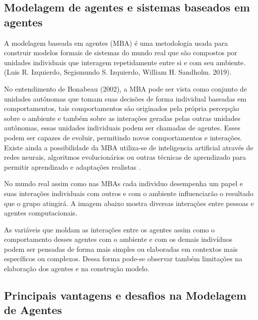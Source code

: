\subsection{Modelagem de agentes e sistemas baseados em agentes}

A modelagem baseada em agentes (MBA) é uma metodologia usada para construir modelos formais de sistemas do mundo real que são compostos por unidades individuais que interagem repetidamente entre si e com seu ambiente.(Luis R. Izquierdo, Segismundo S. Izquierdo, William H. Sandholm. 2019)\cite{izquierdo2019introduction}. 

No entendimento de Bonabeau (2002), a MBA pode ser vista como conjunto de unidades autônomas que tomam suas decisões de forma individual baseadas em comportamentos, tais comportamentos são originados pela própria percepção sobre o ambiente e também sobre as interações geradas pelas outras unidades autônomas, essas unidades individuais podem ser chamadas de agentes. Esses podem ser capazes de evoluir, permitindo novos comportamentos e interações. Existe ainda a possibilidade da MBA utiliza-se de inteligencia artificial através de redes neurais, algoritmos evolucionários ou outras técnicas de aprendizado para permitir aprendizado e adaptações realistas \cite{bonabeau2002agent}. 

No mundo real assim como nas MBAs cada individuo desempenha um papel e suas interações individuais com outros e com o ambiente influenciarão o resultado que o grupo atingirá. A imagem abaixo mostra diversas interações entre pessoas e agentes computacionais.  

As variáveis que moldam as interações entre os agentes assim como o comportamento desses agentes com o ambiente e com os demais indivíduos podem ser pensadas de forma mais simples ou elaboradas em contextos mais específicos ou complexos. Dessa forma pode-se observar também limitações na elaboração dos agentes e na construção modelo.


\subsection{Principais vantagens e desafios na Modelagem de Agentes}

